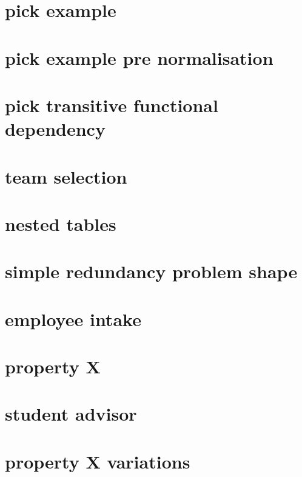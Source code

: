 \documentclass[10pt,a4paper]{article}
\begin{document}
\section{pick example}


\section{pick example pre normalisation}


\section{pick transitive functional dependency}


\section{team selection}


\iffalse
\needspace{20\baselineskip}
\section{nested rows}

\fi

\section{nested tables}


\section{simple redundancy problem shape}


\section{employee intake}


\section{property X}


\section{student advisor}


\section{property X variations}

\end{document}
